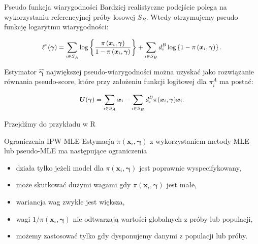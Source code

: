 \documentclass[10pt,ignorenonframetext, aspectratio=169]{beamer}
\newcommand{\bx}{\boldsymbol{x}}
\newcommand{\bU}{\boldsymbol{U}}
\newcommand{\bgamma}{\boldsymbol{\gamma}}
\begin{document}
\begin{frame}{Pseudo funkcja wiarygodności}
    Bardziej realistyczne podejście polega na wykorzystaniu referencyjnej próby losowej $S_B$. Wtedy otrzymujemy pseudo funkcję logarytmu wiarygodności:
    
    \begin{equation}
    \small
    \ell^*(\bgamma) = \sum_{i \in S_{A}} \log \left\{\frac{\pi\left(\bx_i, \bgamma\right)}{1-\pi\left(\bx_i, \bgamma\right)}\right\} + \sum_{i \in S_{B}} d_i^B \log \left\{1-\pi\left(\bx_i, \bgamma\right)\right\}.
    \end{equation}
    
    \vspace{0.5em}
    
    Estymator $\hat{\bgamma}$ największej pseudo-wiarygodności można uzyskać jako rozwiązanie równania pseudo-score, które przy założeniu funkcji logitowej dla $\pi_i^A$ ma postać:
    
    \begin{equation}
    \small
    \bU(\bgamma) = \sum_{i \in S_A} \bx_i - \sum_{i \in S_B} d_i^B \pi(\bx_i, \bgamma) \bx_i.
    \end{equation}
\end{frame}

\begin{frame}{}
    Przejdźmy do przykładu w R
\end{frame}

\begin{frame}{Ograniczenia IPW MLE}
Estymacja $\pi(\bx_i, \bgamma)$ z wykorzystaniem metody MLE lub pseudo-MLE ma następujące ograniczenia
    \begin{itemize}
        \item  działa tylko jeżeli model dla $\pi(\bx_i, \bgamma)$ jest poprawnie wyspecifykowany,
        \item może skutkować dużymi wagami gdy $\pi(\bx_i, \bgamma)$ jest małe,
        \item wariancja wag zwykle jest większa,
        \item wagi $1/\pi(\bx_i, \bgamma)$ nie odtwarzają wartości globalnych z próby lub populacji,
        \item możemy zastosować tylko gdy dysponujemy danymi z populacji lub próby.
    \end{itemize}
\end{frame}
\end{document}
